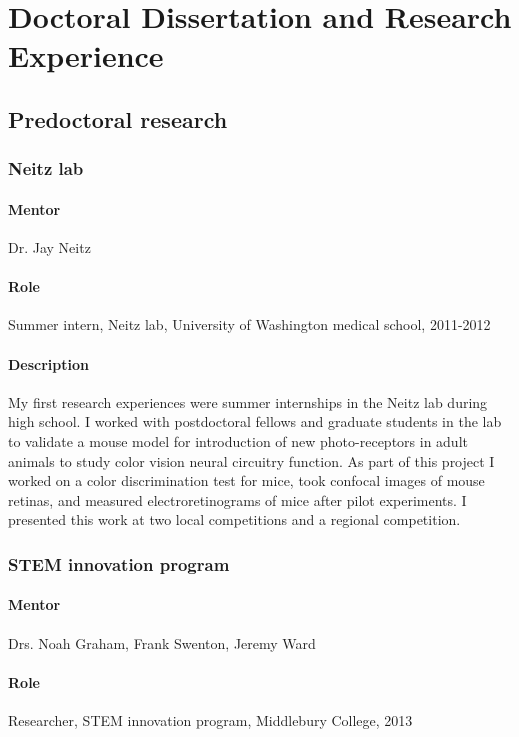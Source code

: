 \documentclass[11pt]{article}
\begin{document}
\section*{Doctoral Dissertation and Research Experience}
%
\subsection{Predoctoral research}
\subsubsection{Neitz lab}
\begin{refsection}
\paragraph{Mentor}
Dr. Jay Neitz
%
\paragraph{Role}
Summer intern, Neitz lab, University of Washington medical school, 2011-2012
%
\paragraph{Description}
My first research experiences were summer internships in the Neitz lab during high school. 
I worked with postdoctoral fellows and graduate students in the lab to validate a mouse model for introduction of new photo-receptors in adult animals to study color vision neural circuitry function. 
As part of this project I worked on a color discrimination test for mice, took confocal images of mouse retinas, and measured electroretinograms of mice after pilot experiments.
I presented this work at two local competitions and a regional competition.
%
\nocite{Desmarais2012-ki,Desmarais2012-oz,Desmarais2012-nx}
\printbibliography[heading=none]
\end{refsection}
%
\subsubsection{STEM innovation program}
\paragraph{Mentor}
Drs. Noah Graham, Frank Swenton, Jeremy Ward
%
\paragraph{Role}
Researcher, STEM innovation program, Middlebury College, 2013
%
\end{document}
